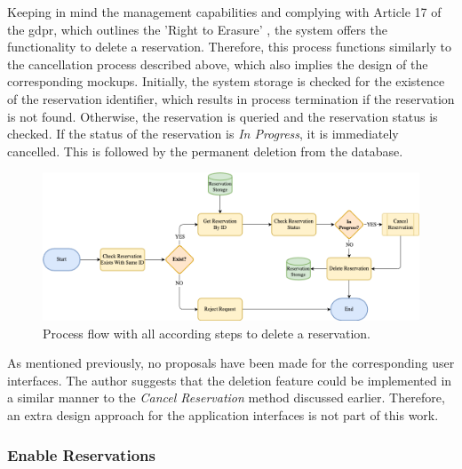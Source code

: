 Keeping in mind the management capabilities and complying with Article 17 of the \acrfull{gdpr}, which outlines the 'Right to Erasure' \cite{noauthor_art_2018}, the system offers the functionality to delete a reservation.
Therefore, this process functions similarly to the cancellation process described above, which also implies the design of the corresponding mockups.
Initially, the system storage is checked for the existence of the reservation identifier, which results in process termination if the reservation is not found. 
Otherwise, the reservation is queried and the reservation status is checked. If the status of the reservation is \textit{In Progress}, it is immediately cancelled. This is followed by the permanent deletion from the database. 

\begin{figure}[h]
    \centering
    \includegraphics[scale=0.4]{resources/images/main/5_design/processes/ReservationDelete.png}
    \caption{Process flow with all according steps to delete a reservation.}
    \label{fig:delete-reservation-flowchart}
\end{figure}

\noindent As mentioned previously, no proposals have been made for the corresponding user interfaces. The author suggests that the deletion feature could be implemented in a similar manner to the \textit{Cancel Reservation} method discussed earlier. Therefore, an extra design approach for the application interfaces is not part of this work.

\newpage

\subsubsection{Enable Reservations}
\label{ch:Design:sec:Reservation System:ssec:Management Capabilities:sssec:Enable Reservations}

